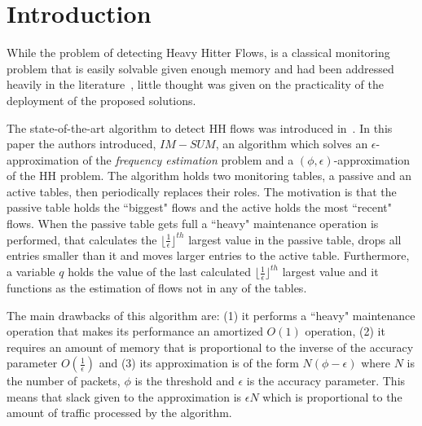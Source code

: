 \section{Introduction}
\label{sec:introduction}

While the problem of detecting Heavy Hitter Flows, is a classical monitoring problem that is easily solvable given enough memory and had been addressed heavily in the literature~\cite{fang1999computing,gilbert2001surfing,karp2003simple,Demaine2002,slidingHH,basat2017optimal,zadnik2011evolution}, little thought was given on the practicality of the deployment of the proposed solutions.

The state-of-the-art algorithm to detect HH flows was introduced in~\cite{basat2017optimal}. In this paper the authors introduced, $IM-SUM$, an algorithm which solves an $\epsilon$-approximation of the \textit{frequency estimation} problem and a $(\phi, \epsilon)$-approximation of the HH problem. The algorithm holds two monitoring tables, a passive and an active tables, then periodically replaces their roles. The motivation is that the passive table holds the ``biggest" flows and the active holds the most ``recent" flows. When the passive table gets full a ``heavy" maintenance operation is performed, that calculates the $\lfloor\frac{1}{\epsilon}\rfloor^{th}$ largest value in the passive table, drops all entries smaller than it and moves larger entries to the active table. Furthermore, a variable $q$ holds the value of the last calculated $\lfloor\frac{1}{\epsilon}\rfloor^{th}$ largest value and it functions as the estimation of flows not in any of the tables.

The main drawbacks of this algorithm are: (1) it performs a ``heavy" maintenance operation that makes its performance an amortized $O(1)$ operation, (2) it requires an amount of memory that is proportional to the inverse of the accuracy parameter $O(\frac{1}{\epsilon})$ and (3) its approximation is of the form $N(\phi -\epsilon)$ where $N$ is the number of packets, $\phi$ is the threshold and $\epsilon$ is the accuracy parameter. This means that slack given to the approximation is $\epsilon N$ which is proportional to the amount of traffic processed by the algorithm.

